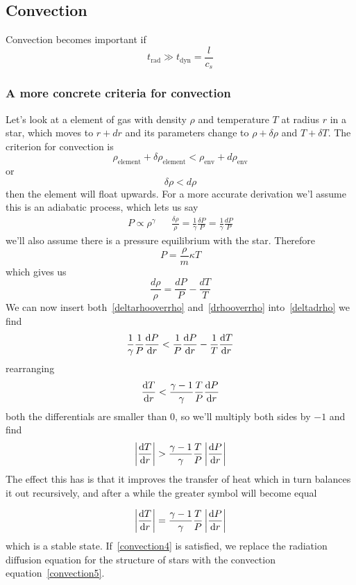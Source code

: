 \subsection{Convection}
Convection becomes important if
\begin{equation}
	t_{\text{rad}} \gg t_{\text{dyn}} = \frac{l}{c_s}
\end{equation}
\subsubsection{A more concrete criteria for convection}
Let's look at a element of gas with density \(\rho\) and temperature \(T\) at radius \(r\) in a star, which moves to \(r+dr\) and its parameters change to \(\rho+\delta\rho\) and \(T+\delta T\). The criterion for convection is
\begin{equation}
	\rho_{\text{element}}+\delta\rho_{\text{element}} < \rho_{\text{env}} + d\rho_{\text{env}}
\end{equation}
or
\begin{equation}\label{deltadrho}
	\delta\rho < d\rho
\end{equation}
then the element will float upwards. For a more accurate derivation we'l assume this is an adiabatic process, which lets us say
\begin{align}\label{deltarhooverrho}
	P\propto \rho^\gamma && \frac{\delta\rho}{\rho} = \frac{1}{\gamma}\frac{\delta P}{P} = \frac{1}{\gamma}\frac{dP}{P}
\end{align}
we'll also assume there is a pressure equilibrium with the star. Therefore
\begin{equation}
	P = \frac{\rho}{m}\kappa T
\end{equation}
which gives us
\begin{equation}\label{drhooverrho}
	\frac{d\rho}{\rho} = \frac{dP}{P}-\frac{dT}{T}
\end{equation}
We can now insert both~\ref{deltarhooverrho} and~\ref{drhooverrho} into~\ref{deltadrho} we find
\begin{equation}
	\frac{1}{\gamma}\frac{1}{P}\diff{P}{r} < \frac{1}{P}\diff{P}{r}-\frac{1}{T}\diff{T}{r}
\end{equation}
rearranging
\begin{equation}
	\diff{T}{r} < \frac{\gamma-1}{\gamma}\frac{T}{P}\diff{P}{r}
\end{equation}
both the differentials are smaller than 0, so we'll multiply both sides by \(-1\) and find
\begin{equation}\label{convection4}
	\left\lvert\diff{T}{r}\right\rvert > \frac{\gamma-1}{\gamma}\frac{T}{P}\left\lvert\diff{P}{r}\right\rvert
\end{equation}
The effect this has is that it improves the transfer of heat which in turn balances it out recursively, and after a while the greater symbol will become equal

\begin{equation}\label{convection5}
	\left\lvert\diff{T}{r}\right\rvert = \frac{\gamma-1}{\gamma}\frac{T}{P}\left\lvert\diff{P}{r}\right\rvert
\end{equation}
which is a stable state. If~\ref{convection4} is satisfied, we replace the radiation diffusion equation for the structure of stars with the convection equation~\ref{convection5}.